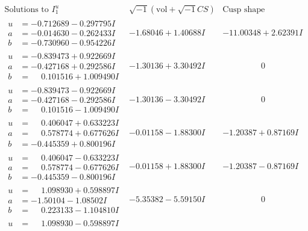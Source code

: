 \documentclass[1p]{elsarticle_modified}
\theoremstyle{definition}
\newcommand{\I}{\sqrt{-1}}
\begin{document}
$$\begin{array}{c|c|c}
\text{Solutions to }I^u_{1}& \I (\text{vol} + \sqrt{-1}CS) & \text{Cusp shape}\\
 \hline 
\begin{aligned}
u &= -0.712689 - 0.297795 I \\
a &= -0.014630 - 0.262433 I \\
b &= -0.730960 - 0.954226 I\end{aligned}
 & -1.68046 + 1.40688 I & -11.00348 + 2.62391 I \\ \hline\begin{aligned}
u &= -0.839473 + 0.922669 I \\
a &= -0.427168 + 0.292586 I \\
b &= \phantom{-}0.101516 + 1.009490 I\end{aligned}
 & -1.30136 + 3.30492 I & \phantom{-0.000000 } 0 \\ \hline\begin{aligned}
u &= -0.839473 - 0.922669 I \\
a &= -0.427168 - 0.292586 I \\
b &= \phantom{-}0.101516 - 1.009490 I\end{aligned}
 & -1.30136 - 3.30492 I & \phantom{-0.000000 } 0 \\ \hline\begin{aligned}
u &= \phantom{-}0.406047 + 0.633223 I \\
a &= \phantom{-}0.578774 + 0.677626 I \\
b &= -0.445359 + 0.800196 I\end{aligned}
 & -0.01158 - 1.88300 I & -1.20387 + 0.87169 I \\ \hline\begin{aligned}
u &= \phantom{-}0.406047 - 0.633223 I \\
a &= \phantom{-}0.578774 - 0.677626 I \\
b &= -0.445359 - 0.800196 I\end{aligned}
 & -0.01158 + 1.88300 I & -1.20387 - 0.87169 I \\ \hline\begin{aligned}
u &= \phantom{-}1.098930 + 0.598897 I \\
a &= -1.50104 - 1.08502 I \\
b &= \phantom{-}0.223133 - 1.104810 I\end{aligned}
 & -5.35382 - 5.59150 I & \phantom{-0.000000 } 0 \\ \hline\begin{aligned}
u &= \phantom{-}1.098930 - 0.598897 I \\

\end{aligned}
\end{array}$$
\end{document}
